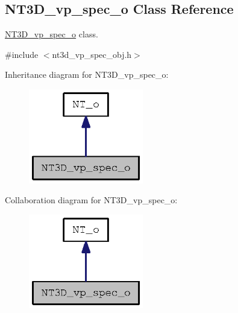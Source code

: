\subsection{NT3D\_\-vp\_\-spec\_\-o Class Reference}
\label{class_n_t3_d__vp__spec__o}


\hyperlink{class_n_t3_d__vp__spec__o}{NT3D\_\-vp\_\-spec\_\-o} class.  




{\ttfamily \#include $<$nt3d\_\-vp\_\-spec\_\-obj.h$>$}



Inheritance diagram for NT3D\_\-vp\_\-spec\_\-o:
\nopagebreak
\begin{figure}[H]
\begin{center}
\leavevmode
\includegraphics[width=142pt]{class_n_t3_d__vp__spec__o__inherit__graph}
\end{center}
\end{figure}


Collaboration diagram for NT3D\_\-vp\_\-spec\_\-o:
\nopagebreak
\begin{figure}[H]
\begin{center}
\leavevmode
\includegraphics[width=142pt]{class_n_t3_d__vp__spec__o__coll__graph}
\end{center}
\end{figure}
